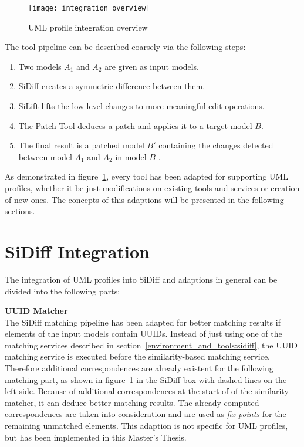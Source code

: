 \begin{figure}[h!]
\begin{center}
\texttt{[image: integration\_overview]}\\
\end{center}
\caption{UML profile integration overview}
\label{integration_overview}
\end{figure}
The tool pipeline can be described coarsely via the following steps:
\begin{enumerate}
  \item Two models $A_1$ and $A_2$ are given as input models.
  \item SiDiff creates a symmetric difference between them.
  \item SiLift lifts the low-level changes to more meaningful edit operations.
  \item The Patch-Tool deduces a patch and applies it to a target model $B$.
  \item The final result is a patched model $B'$ containing the changes
  detected between model $A_1$ and $A_2$ in model $B$ .
\end{enumerate}
As demonstrated in figure~\ref{integration_overview}, every tool has been
adapted for supporting \ac{UML} profiles, whether it be just modifications on
existing tools and services or creation of new ones. The concepts of this
adaptions will be presented in the following sections.
\section{SiDiff Integration}\label{Integration:sidiff}
The integration of \ac{UML} profiles into SiDiff and adaptions in general
can be divided into the following parts:

\textbf{\ac{UUID} Matcher}\\
The SiDiff matching pipeline has been adapted for better matching results if
elements of the input models contain \ac{UUID}s. Instead of just using one of
the matching services described in section~\ref{environment_and_tools:sidiff}, the
\ac{UUID} matching service is executed before the similarity-based matching
service. Therefore additional correspondences are already existent for the
following matching part, as shown in figure~\ref{integration_overview} in the
SiDiff box with dashed lines on the left side. Because of additional
correspondences at the start of of the similarity-matcher, it can deduce better
matching results. The already computed correspondences are taken into
consideration and are used as \textit{fix points} for the remaining unmatched
elements. This adaption is not specific for \ac{UML} profiles, but has been
implemented in this Master's Thesis.

